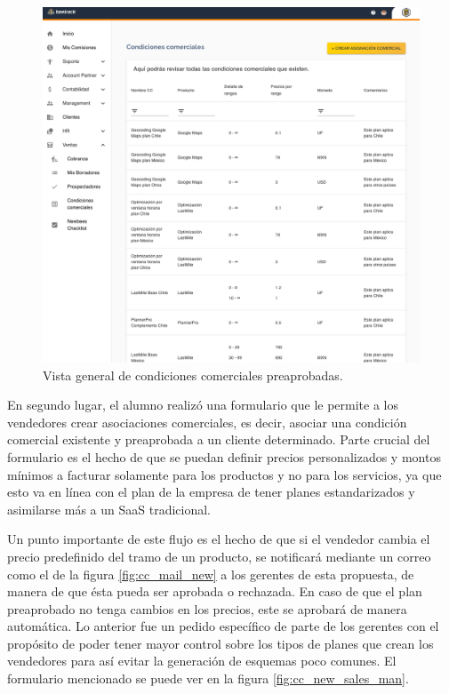     \begin{figure}[H]
      \centering
      \includegraphics[width=0.6\linewidth]{figures/cc/vistas/cc_visible.png}
      \caption{Vista general de condiciones comerciales preaprobadas.}
      \label{fig:cc_visible}
    \end{figure}

    En segundo lugar, el alumno realizó una formulario que le permite a los vendedores crear asociaciones comerciales, es decir, asociar una condición comercial existente y preaprobada a un cliente determinado. Parte crucial del formulario es el hecho de que se puedan definir precios personalizados y montos mínimos a facturar solamente para los productos y no para los servicios, ya que esto va en línea con el plan de la empresa de tener planes estandarizados y asimilarse más a un SaaS tradicional. 
    
    Un punto importante de este flujo es el hecho de que si el vendedor cambia el precio predefinido del tramo de un producto, se notificará mediante un correo como el de la figura \ref{fig:cc_mail_new} a los gerentes de esta propuesta, de manera de que ésta pueda ser aprobada o rechazada. En caso de que el plan preaprobado no tenga cambios en los precios, este se aprobará de manera automática. Lo anterior fue un pedido específico de parte de los gerentes con el propósito de poder tener mayor control sobre los tipos de planes que crean los vendedores para así evitar la generación de esquemas poco comunes. El formulario mencionado se puede ver en la figura \ref{fig:cc_new_sales_man}.

